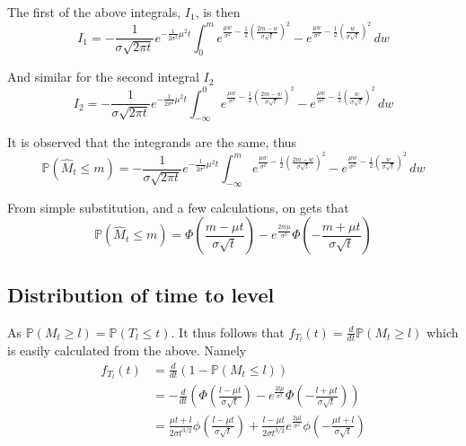 \documentclass[../Thesis.tex]{subfiles}
\begin{document}
The first of the above integrals, $I_1$, is then
$$I_1 = -\frac{1}{\sigma \sqrt{2\pi t}} e^{-\frac{1}{2 \sigma^2} \mu^2 t } \int_0^m  e^{\frac{\mu w}{\sigma^2} - \frac{1}{2} \left(\frac{2m - w}{\sigma \sqrt{t}}\right)^2} - e^{\frac{\mu w}{\sigma^2} - \frac{1}{2} \left(\frac{w}{\sigma \sqrt{t}}\right)^2}  \, dw$$

And similar for the second integral $I_2$
$$I_2 = -\frac{1}{\sigma \sqrt{2\pi t}} e^{-\frac{1}{2 \sigma^2} \mu^2 t } \int_{-\infty}^0  e^{\frac{\mu w}{\sigma^2} - \frac{1}{2} \left(\frac{2m - w}{\sigma \sqrt{t}}\right)^2} - e^{\frac{\mu w}{\sigma^2} - \frac{1}{2} \left(\frac{w}{\sigma \sqrt{t}}\right)^2}  \, dw$$

It is observed that the integrands are the same, thus
$$\mathbb{P}\left(\hat{M}_t \leq m\right) = -\frac{1}{\sigma \sqrt{2\pi t}} e^{-\frac{1}{2 \sigma^2} \mu^2 t } \int_{-\infty}^m  e^{\frac{\mu w}{\sigma^2} - \frac{1}{2} \left(\frac{2m - w}{\sigma \sqrt{t}}\right)^2} - e^{\frac{\mu w}{\sigma^2} - \frac{1}{2} \left(\frac{w}{\sigma \sqrt{t}}\right)^2}  \, dw$$

From simple substitution, and a few calculations, on gets that
$$\mathbb{P}\left(\hat{M}_t \leq m\right) = \Phi\left(\frac{m-\mu t}{\sigma \sqrt{t}}\right) - e^{\frac{2m\mu}{\sigma^2}} \Phi\left( -\frac{m+\mu t}{\sigma \sqrt{t}} \right)$$



\subsection{Distribution of time to level}
As $\mathbb{P}\left( M_t \geq l \right) = \mathbb{P}\left( T_l \leq t \right)$. It thus follows that $f_{T_l}(t) = \frac{d}{dt} \mathbb{P}\left( M_t \geq l \right)$ which is easily calculated from the above. Namely
\begin{align*}
    f_{T_l} (t) & = \frac{d}{dt}\left(1 - \mathbb{P}\left(M_t \leq l\right)\right)                                                                                                                                          \\
                & = - \frac{d}{dt} \left( \Phi\left(\frac{l-\mu t}{\sigma \sqrt{t}}\right) - e^{\frac{2l\mu}{\sigma^2}} \Phi\left( -\frac{l + \mu t}{\sigma \sqrt{t}} \right) \right)                                       \\
                & = \frac{\mu t + l}{2\sigma t^{3/2}}\phi\left(\frac{l-\mu t}{\sigma \sqrt{t}}\right) + \frac{l - \mu t }{2\sigma t^{3/2}} e^{\frac{2\mu l}{\sigma^2}} \phi\left(- \frac{\mu t + l}{\sigma \sqrt{t}}\right)
\end{align*}
\end{document}
